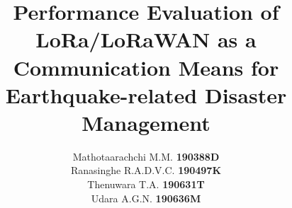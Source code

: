 \documentclass{template}
\title{Performance Evaluation of LoRa/LoRaWAN as a
Communication Means for Earthquake-related
Disaster Management}
\author{Mathotaarachchi M.M.  \textbf{190388D}\\
        Ranasinghe R.A.D.V.C. \textbf{190497K}\\
        Thenuwara T.A. \textbf{190631T}\\
        Udara A.G.N. \textbf{190636M}}
\begin{document}
% 
% 
% 
% 


\newpage
 \citeall 
\printbibliography
\end{document}
